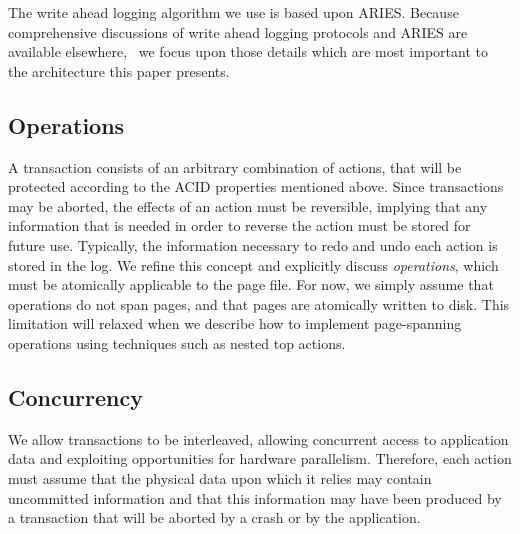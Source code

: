 \documentclass[letterpaper,twocolumn,english]{article}
\newcommand{\yad}{Lemon\xspace}
\begin{document}
The write ahead logging algorithm we use is based upon ARIES. Because
comprehensive discussions of write ahead logging protocols and ARIES
are available elsewhere,~\cite{haerder, aries} we focus upon those
details which are most important to the architecture this paper
presents.



%


\subsection{Operations\label{sub:OperationProperties}}

A transaction consists of an arbitrary combination of actions, that
will be protected according to the ACID properties mentioned above.
Since transactions may be aborted, the effects of an action must be
reversible, implying that any information that is needed in order to
reverse the action must be stored for future use.  Typically, the
information necessary to redo and undo each action is stored in the
log.  We refine this concept and explicitly discuss {\em operations},
which must be atomically applicable to the page file.  For now, we
simply assume that operations do not span pages, and that pages are
atomically written to disk.  This limitation will relaxed when we
describe how to implement page-spanning operations using techniques
such as nested top actions.

\subsection{Concurrency}

We allow transactions to be interleaved, allowing concurrent access to
application data and exploiting opportunities for hardware
parallelism.  Therefore, each action must assume that the
physical data upon which it relies may contain uncommitted
information and that this information may have been produced by a
transaction that will be aborted by a crash or by the application.
\end{document}
